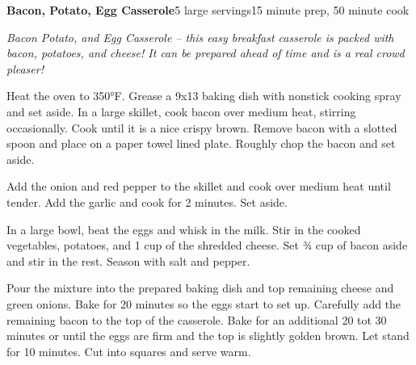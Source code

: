 \documentclass[../recipe-collections/cooking.tex]{subfiles}
\begin{document}
\begin{recipe}{\textbf{Bacon, Potato, Egg Casserole}}{5 large servings}{15 minute prep, 50 minute cook}

  \freeform{}\textit{Bacon Potato, and Egg Casserole – this easy breakfast 
  casserole is packed with bacon, potatoes, and cheese! It can be prepared 
  ahead of time and is a real crowd pleaser!}


  Heat the oven to 350°F. Grease a 9x13 baking dish with nonstick cooking spray and set aside.
  In a large skillet, cook bacon over medium heat, stirring occasionally. Cook until it is a nice 
  crispy brown. Remove bacon with a slotted spoon and place on a paper towel lined plate. 
  Roughly chop the bacon and set aside.



  Add the onion and red pepper to the skillet and cook over medium heat until tender. 
  Add the garlic and cook for 2 minutes. Set aside.


  In a large bowl, beat the eggs and whisk in the milk. Stir in the cooked vegetables, 
  potatoes, and 1 cup of the shredded cheese. Set ¾ cup of bacon aside and stir in the rest. 
  Season with salt and pepper.

  Pour the mixture into the prepared baking dish and top remaining cheese and green onions.
  Bake for 20 minutes so the eggs start to set up. Carefully add the remaining bacon to the 
  top of the casserole. Bake for an additional 20 tot 30 minutes or until the eggs are firm 
  and the top is slightly golden brown. Let stand for 10 minutes. Cut into squares and serve warm.


\end{recipe}
\end{document}
